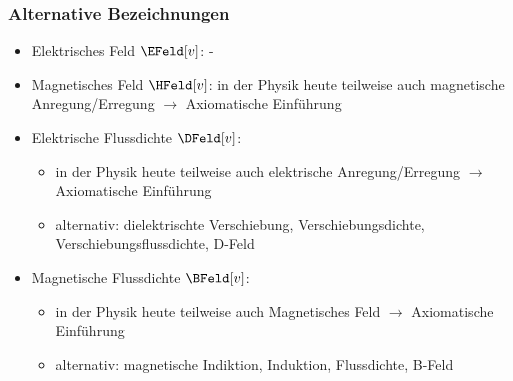 \begin{frame}
  \frametitle{Alternative Bezeichnungen}
  \begin{itemize}[<+->]
    \item Elektrisches Feld $\EFeld[v]$: - 
    \item Magnetisches Feld $\HFeld[v]$: in der Physik heute
      teilweise auch \alert{magnetische Anregung/Erregung} $\to$ Axiomatische
      Einführung
    \item Elektrische Flussdichte $\DFeld[v]$:
      \begin{itemize}[<+->]
        \item in der Physik heute
      teilweise auch \alert{elektrische Anregung/Erregung} $\to$ Axiomatische
      Einführung
      \item alternativ: \alert{dielektrischte Verschiebung,
          Verschiebungsdichte, Verschiebungsflussdichte, D-Feld}
        \end{itemize}
      \item Magnetische Flussdichte $\BFeld[v]$:
        \begin{itemize}[<+->]
          \item in der Physik heute
      teilweise auch \alert{Magnetisches Feld} $\to$ Axiomatische Einführung
      \item alternativ:
        \alert{magnetische Indiktion, Induktion, Flussdichte, B-Feld}
        \end{itemize}
  \end{itemize}    
      
  \end{frame}

